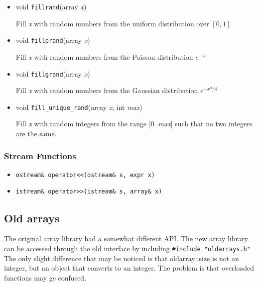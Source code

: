 \begin{itemize}
\item void {\tt fillrand}(array {\em x}) 

Fill {\em x} with random numbers from the uniform distribution over $[0,1]$

\item void {\tt fillprand}(array {\em x})

Fill {\em x} with random numbers from the Poisson distribution $e^{-x}$

\item void {\tt fillgrand}(array {\em x})

Fill {\em x} with random numbers from the Gaussian distribution $e^{-x^2/4}$

\item void {\tt fill\_unique\_rand}(array {\em
    x}, int {\em max})

Fill {\em x} with random integers from the range [0..{\em max}] such
that no two integers are the same.

\end{itemize}

\subsubsection{Stream Functions}
\begin{itemize}
\item \verb|ostream& operator<<(ostream& s, expr x)|
\item \verb|istream& operator>>(istream& s, array& x)|
\end{itemize}

\subsection{Old arrays}

The original array library had a somewhat different API. The new array
library can be accessed through the old interface by including
\verb+#include "oldarrays.h"+ The only slight difference that may be
noticed is that oldarray::size is not an integer, but an object that
converts to an integer. The problem is that overloaded functions may
ge confused.
